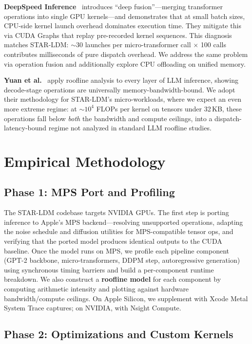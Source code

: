 \documentclass[sigconf,authordraft]{acmart}
\begin{document}
\textbf{DeepSpeed Inference}~\cite{aminabadi2022deepspeed} introduces ``deep fusion''---merging transformer operations into single GPU kernels---and demonstrates that at small batch sizes, CPU-side kernel launch overhead dominates execution time. They mitigate this via CUDA Graphs that replay pre-recorded kernel sequences. This diagnosis matches STAR-LDM: ${\sim}$30 launches per micro-transformer call $\times$ 100 calls contributes milliseconds of pure dispatch overhead. We address the same problem via operation fusion and additionally explore CPU offloading on unified memory.

\textbf{Yuan et al.}~\cite{yuan2024llminference} apply roofline analysis to every layer of LLM inference, showing decode-stage operations are universally memory-bandwidth-bound. We adopt their methodology for STAR-LDM's micro-workloads, where we expect an even more extreme regime: at ${\sim}10^4$ FLOPs per kernel on tensors under 32\,KB, these operations fall below \textit{both} the bandwidth and compute ceilings, into a dispatch-latency-bound regime not analyzed in standard LLM roofline studies.

\section{Empirical Methodology}

\subsection{Phase 1: MPS Port and Profiling}

The STAR-LDM codebase targets NVIDIA GPUs. The first step is porting inference to Apple's MPS backend---resolving unsupported operations, adapting the noise schedule and diffusion utilities for MPS-compatible tensor ops, and verifying that the ported model produces identical outputs to the CUDA baseline. Once the model runs on MPS, we profile each pipeline component (GPT-2 backbone, micro-transformers, DDPM step, autoregressive generation) using synchronous timing barriers and build a per-component runtime breakdown. We also construct a \textbf{roofline model} for each component by computing arithmetic intensity and plotting against hardware bandwidth/compute ceilings. On Apple Silicon, we supplement with Xcode Metal System Trace captures; on NVIDIA, with Nsight Compute.

\subsection{Phase 2: Optimizations and Custom Kernels}
\end{document}

